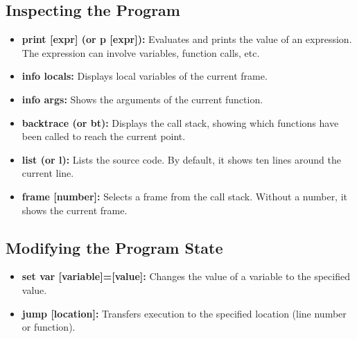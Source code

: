\documentclass{report}
\begin{document}
     \subsection{Inspecting the Program}
     \begin{itemize}
         \item \textbf{print [expr] (or p [expr]):} Evaluates and prints the value of an expression. The expression can involve variables, function calls, etc.
         \item \textbf{info locals:} Displays local variables of the current frame.
         \item \textbf{info args:} Shows the arguments of the current function.
         \item \textbf{backtrace (or bt):} Displays the call stack, showing which functions have been called to reach the current point.
         \item \textbf{list (or l):} Lists the source code. By default, it shows ten lines around the current line.
         \item \textbf{frame [number]:} Selects a frame from the call stack. Without a number, it shows the current frame.
     \end{itemize}
     \bigbreak \noindent 
     \subsection{Modifying the Program State}
     \begin{itemize}
         \item \textbf{set var [variable]=[value]:} Changes the value of a variable to the specified value.
         \item \textbf{jump [location]:} Transfers execution to the specified location (line number or function).
     \end{itemize}
\end{document}
